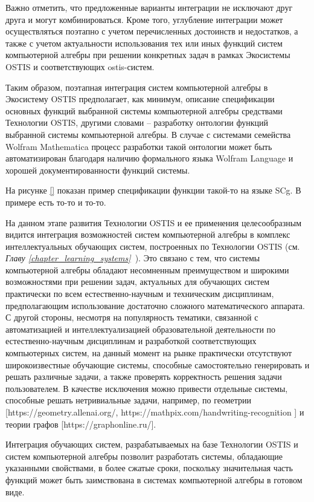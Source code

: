 Важно отметить, что предложенные варианты интеграции не исключают друг друга и могут комбинироваться. Кроме того, углубление интеграции может осуществляться поэтапно с учетом перечисленных достоинств и недостатков, а также с учетом актуальности использования тех или иных функций систем компьютерной алгебры при решении конкретных задач в рамках Экосистемы OSTIS и соответствующих ostis-систем.

Таким образом, поэтапная интеграция систем компьютерной алгебры в Экосистему OSTIS предполагает, как минимум, описание спецификации основных функций выбранной системы компьютерной алгебры средствами Технологии OSTIS, другими словами -- разработку онтологии функций выбранной системы компьютерной алгебры. В случае с системами семейства Wolfram Mathematica процесс разработки такой онтологии может быть автоматизирован благодаря наличию формального языка Wolfram Language и хорошей документированности функций системы.

На рисунке \ref{} показан пример спецификации функции такой-то на языке SCg. В примере есть то-то и то-то.

На данном этапе развития Технологии OSTIS и ее применения целесообразным видится интеграция возможностей систем компьютерной алгебры в комплекс интеллектуальных обучающих систем, построенных по Технологии OSTIS (см. \textit{Главу \ref{chapter_learning_systems}~}). Это связано с тем, что системы компьютерной алгебры обладают несомненным преимуществом и широкими возможностями при решении задач, актуальных для обучающих систем практически по всем естественно-научным и техническим дисциплинам, предполагающим использование достаточно сложного математического аппарата. С другой стороны, несмотря на популярность тематики, связанной с автоматизацией и интеллектуализацией образовательной деятельности по естественно-научным дисциплинам и разработкой соответствующих компьютерных систем, на данный момент на рынке практически отсутствуют широкоизвестные обучающие системы, способные самостоятельно генерировать и решать различные задачи, а также проверять корректность решения задачи пользователем. В качестве исключения можно привести отдельные системы, способные решать нетривиальные задачи, например, по геометрии [https://geometry.allenai.org/, https://mathpix.com/handwriting-recognition ] и теории графов [https://graphonline.ru/].

Интеграция обучающих систем, разрабатываемых на базе Технологии OSTIS и систем компьютерной алгебры позволит разработать системы, обладающие указанными свойствами, в более сжатые сроки, поскольку значительная часть функций может быть заимствована в системах компьютерной алгебры в готовом виде.

